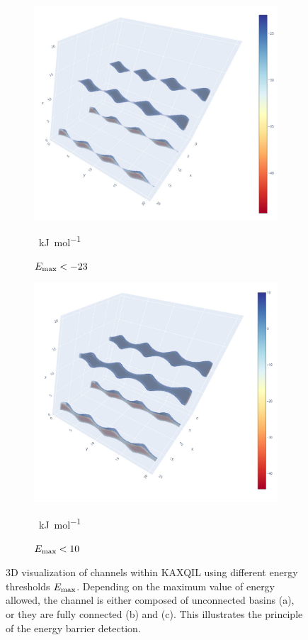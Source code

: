 \documentclass[main]{subfiles}
\begin{document}
\begin{figure}[ht]
\begin{subfigure}[b]{0.3\textwidth}
    \includegraphics[width=\textwidth]{figures/5-diffusion/KAXQIL_23.jpg}
    \caption{$E_{\text{max}}<-23$}~\si{\kJ\per\mole}\label{fgr:KAXQIL_23}
  \end{subfigure}
  \hfill
  \begin{subfigure}[b]{0.3\textwidth}
      \centering
      \includegraphics[width=\textwidth]{figures/5-diffusion/KAXQIL_10.jpg}
      \caption{$E_{\text{max}}<10$}~\si{\kJ\per\mole}\label{fgr:KAXQIL_channel}
  \end{subfigure}
    \caption{ 3D visualization of channels within KAXQIL using different energy thresholds $E_{\text{max}}$. Depending on the maximum value of energy allowed, the channel is either composed of unconnected basins (a), or they are fully connected (b) and (c). This illustrates the principle of the energy barrier detection. }\label{fgr:KAXQIL_channels}
\end{figure}
\end{document}
